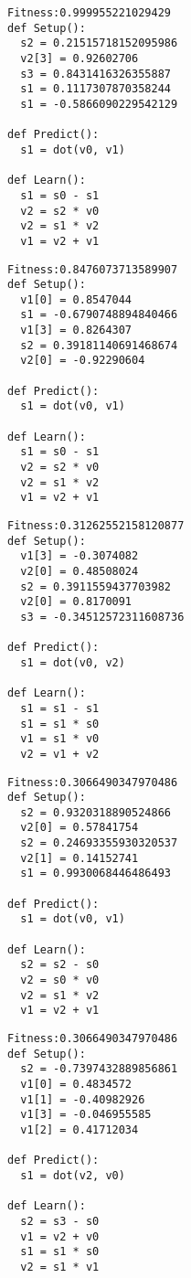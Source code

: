 \documentclass[twocolumn, a4j]{jarticle}
\begin{document}
\newpage

\newpage
\begin{lstlisting}[caption= No. 5.1]
Fitness:0.999955221029429 
def Setup():
  s2 = 0.21515718152095986
  v2[3] = 0.92602706
  s3 = 0.8431416326355887
  s1 = 0.1117307870358244
  s1 = -0.5866090229542129

def Predict():
  s1 = dot(v0, v1)

def Learn():
  s1 = s0 - s1
  v2 = s2 * v0
  v2 = s1 * v2
  v1 = v2 + v1

\end{lstlisting}

\begin{lstlisting}[caption= No. 5.2]
Fitness:0.8476073713589907 
def Setup():
  v1[0] = 0.8547044
  s1 = -0.6790748894840466
  v1[3] = 0.8264307
  s2 = 0.39181140691468674
  v2[0] = -0.92290604

def Predict():
  s1 = dot(v0, v1)

def Learn():
  s1 = s0 - s1
  v2 = s2 * v0
  v2 = s1 * v2
  v1 = v2 + v1

\end{lstlisting}

\newpage

\begin{lstlisting}[caption= No. 5.3]
Fitness:0.31262552158120877 
def Setup():
  v1[3] = -0.3074082
  v2[0] = 0.48508024
  s2 = 0.3911559437703982
  v2[0] = 0.8170091
  s3 = -0.34512572311608736

def Predict():
  s1 = dot(v0, v2)

def Learn():
  s1 = s1 - s1
  s1 = s1 * s0
  v1 = s1 * v0
  v2 = v1 + v2

\end{lstlisting}

\begin{lstlisting}[caption= No. 5.4]
Fitness:0.3066490347970486 
def Setup():
  s2 = 0.9320318890524866
  v2[0] = 0.57841754
  s2 = 0.24693355930320537
  v2[1] = 0.14152741
  s1 = 0.9930068446486493

def Predict():
  s1 = dot(v0, v1)

def Learn():
  s2 = s2 - s0
  v2 = s0 * v0
  v2 = s1 * v2
  v1 = v2 + v1

\end{lstlisting}

\newpage

\begin{lstlisting}[caption= No. 5.5]
Fitness:0.3066490347970486 
def Setup():
  s2 = -0.7397432889856861
  v1[0] = 0.4834572
  v1[1] = -0.40982926
  v1[3] = -0.046955585
  v1[2] = 0.41712034

def Predict():
  s1 = dot(v2, v0)

def Learn():
  s2 = s3 - s0
  v1 = v2 + v0
  s1 = s1 * s0
  v2 = s1 * v1

\end{lstlisting}
\end{document}

